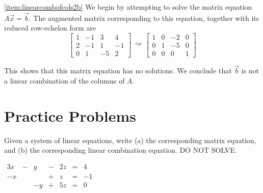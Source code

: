 \documentclass{ximera}
\begin{document}
\begin{example}
\begin{explanation}
\ref{item:linearcombofcols2b}   We begin by attempting to solve the matrix equation  $A\vec{x}=\vec{b}$.  The augmented matrix corresponding to this equation, together with its reduced row-echelon form are
$$\left[\begin{array}{ccc|c}  
 1&-1&3&4\\2&-1&1&-1\\0&1&-5&2
 \end{array}\right]\begin{array}{c}
 \\
 \rightsquigarrow\\
 \\
 \end{array}\left[\begin{array}{ccc|c}  
 1&0&-2&0\\0&1&-5&0\\0&0&0&1
 \end{array}\right]$$

This shows that this matrix equation has no solutions.  We conclude that $\vec{b}$ is not a linear combination of the columns of $A$. 

\end{explanation}
\end{example}

\section*{Practice Problems}
 \begin{problem}\label{prob:systomatrixeq}
Given a system of linear equations, write (a) the corresponding matrix equation, and (b) the corresponding linear combination equation.  DO NOT SOLVE.
\begin{center}
$\begin{array}{ccccccc}
       3x&- &y &- &2z&= &4 \\
     -x& & &+ &z&= &-1 \\
     & &-y &+ &5z&=&0
    \end{array}$
\end{center}
\end{problem}
\end{document}
